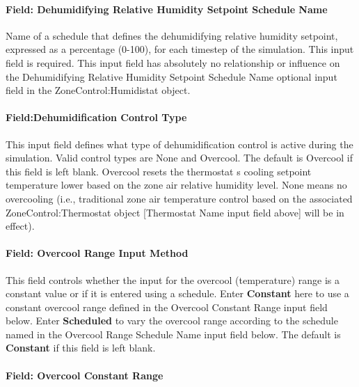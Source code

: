 \paragraph{Field: Dehumidifying Relative Humidity Setpoint Schedule Name}\label{field-dehumidifying-relative-humidity-setpoint-schedule-name}

Name of a schedule that defines the dehumidifying relative humidity setpoint, expressed as a percentage (0-100), for each timestep of the simulation. This input field is required. This input field has absolutely no relationship or influence on the Dehumidifying Relative Humidity Setpoint Schedule Name optional input field in the ZoneControl:Humidistat object.

\paragraph{Field:Dehumidification Control Type}\label{fielddehumidification-control-type}

This input field defines what type of dehumidification control is active during the simulation. Valid control types are None and Overcool. The default is Overcool if this field is left blank. Overcool resets the thermostat s cooling setpoint temperature lower based on the zone air relative humidity level. None means no overcooling (i.e., traditional zone air temperature control based on the associated ZoneControl:Thermostat object {[}Thermostat Name input field above{]} will be in effect).

\paragraph{Field: Overcool Range Input Method}\label{field-overcool-range-input-method}

This field controls whether the input for the overcool (temperature) range is a constant value or if it is entered using a schedule. Enter \textbf{Constant} here to use a constant overcool range defined in the Overcool Constant Range input field below. Enter \textbf{Scheduled} to vary the overcool range according to the schedule named in the Overcool Range Schedule Name input field below. The default is \textbf{Constant} if this field is left blank.

\paragraph{Field: Overcool Constant Range}\label{field-overcool-constant-range}

